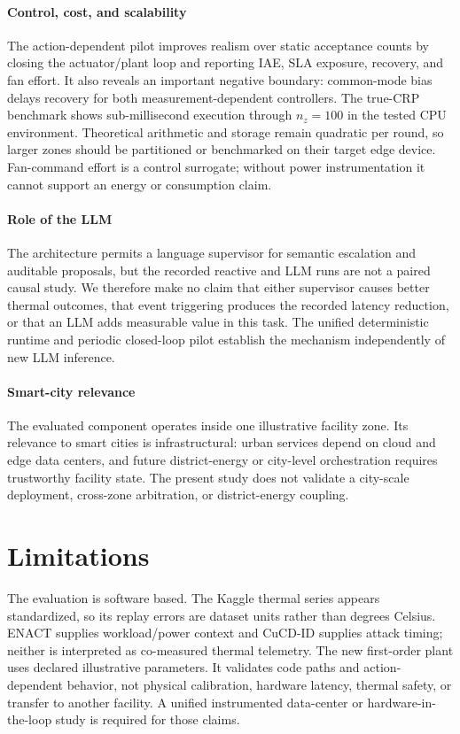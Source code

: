 \documentclass[smartcities,article,submit,moreauthors]{Definitions/mdpi}
\begin{document}
\paragraph{Control, cost, and scalability}
The action-dependent pilot improves realism over static acceptance counts by
closing the actuator/plant loop and reporting IAE, SLA exposure, recovery, and
fan effort. It also reveals an important negative boundary: common-mode bias
delays recovery for both measurement-dependent controllers. The true-CRP
benchmark shows sub-millisecond execution through $n_z=100$ in the tested CPU
environment. Theoretical arithmetic and storage remain quadratic per round, so
larger zones should be partitioned or benchmarked on their target edge device.
Fan-command effort is a control surrogate; without power instrumentation it
cannot support an energy or consumption claim.

\paragraph{Role of the LLM}
The architecture permits a language supervisor for semantic escalation and
auditable proposals, but the recorded reactive and LLM runs are not a
paired causal study. We therefore make no claim that either supervisor causes
better thermal outcomes, that event triggering produces the recorded
latency reduction, or that an LLM adds measurable value in this task. The
unified deterministic runtime and periodic closed-loop pilot establish the
mechanism independently of new LLM inference.

\paragraph{Smart-city relevance}
The evaluated component operates inside one illustrative facility zone. Its
relevance to smart cities is infrastructural: urban services depend on cloud
and edge data centers, and future district-energy or city-level orchestration
requires trustworthy facility state. The present study does not validate a
city-scale deployment, cross-zone arbitration, or district-energy coupling.

\section{Limitations}
\label{sec:limitations}

The evaluation is software based. The Kaggle thermal series appears
standardized, so its replay errors are dataset units rather than degrees
Celsius. ENACT supplies workload/power context and CuCD-ID supplies attack
timing; neither is interpreted as co-measured thermal telemetry. The new
first-order plant uses declared illustrative parameters. It validates code
paths and action-dependent behavior, not physical calibration, hardware
latency, thermal safety, or transfer to another facility. A unified
instrumented data-center or hardware-in-the-loop study is required for those
claims.
\end{document}
